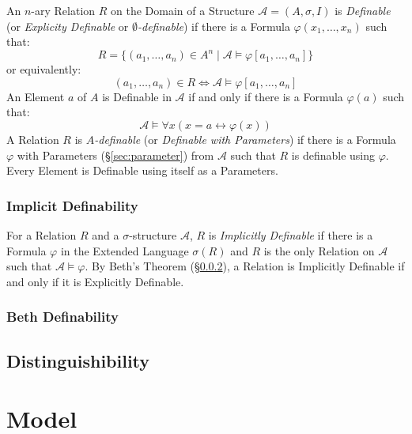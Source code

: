 An $n$-ary Relation $R$ on the Domain of a Structure $\mathcal{A} =
(A, \sigma, I)$ is \emph{Definable} (or \emph{Explicity Definable} or
\emph{$\emptyset$-definable}) if there is a Formula $\varphi
(x_1,\ldots,x_n)$ such that:
\[
  R = \{(a_1,\ldots,a_n) \in A^n \;|\; \mathcal{A} \vDash \varphi
    [a_1, \ldots, a_n]\}
\]
or equivalently:
\[
  (a_1, \ldots, a_n) \in R \Leftrightarrow \mathcal{A} \vDash
    \varphi[a_1, \ldots, a_n]
\]
An Element $a$ of $A$ is Definable in $\mathcal{A}$ if and only if
there is a Formula $\varphi(a)$ such that:
\[
  \mathcal{A} \vDash \forall x (x = a \leftrightarrow \varphi(x))
\]
A Relation $R$ is \emph{$A$-definable} (or \emph{Definable with
  Parameters}) if there is a Formula $\varphi$ with Parameters
(\S\ref{sec:parameter}) from $\mathcal{A}$ such that $R$ is definable
using $\varphi$. Every Element is Definable using itself as a
Parameters.



\subsubsection{Implicit Definability}\label{sec:implicit_definability}

For a Relation $R$ and a $\sigma$-structure $\mathcal{A}$, $R$ is
\emph{Implicitly Definable} if there is a Formula $\varphi$ in the
Extended Language $\sigma(R)$ and $R$ is the only Relation on
$\mathcal{A}$ such that $\mathcal{A} \vDash \varphi$. By Beth's
Theorem (\S\ref{sec:beth_definability}), a Relation is Implicitly
Definable if and only if it is Explicitly Definable.



\subsubsection{Beth Definability}\label{sec:beth_definability}



\subsection{Distinguishibility}\label{sec:distinguishibility}



\section{Model}\label{sec:model}

